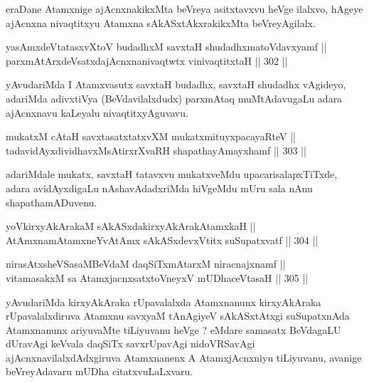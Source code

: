 \begin{artha}
eraDane Atamxnige ajAcnxnakikxMta beVreya asitxtavxvu heVge ilalxvo, hAgeye ajAcnxna nivaqtitxyu Atamxna sAkASxtAkxrakikxMta beVreyAgilalx.
\end{artha}

\begin{shl}
yasAmxdeVtatasxvXtoV budadhxM savxtaH shudadhxmatoV\s davxyamf || \\
parxmAtArxdeVsatxdajAcnxnanivaqtwtx vinivaqtitxtaH \hfill || 302 || 
\end{shl}

\begin{artha}
yAvudariMda I Atamxvasutx savxtaH budadhx, savxtaH shudadhx vAgideyo,
adariMda adivxtiVya (BeVdavilalxdudx) parxmAtaq muMtAdavugaLu adara
ajAcnxnavu kaLeyalu nivaqtitxyAguvavu.
\end{artha}

\begin{shl}
mukatxM cAtaH savxtasatxtatxvXM mukatxmituyxpacayaRteV || \\
tadavidAyxdividhavxMsAtirxrXvaRH shapathayAmayxhamf \hfill || 303 ||  
\end{shl}

\begin{artha}
adariMdale mukatx, savxtaH tatavxvu mukatxveMdu upacarisalapxTiTxde,
adara avidAyxdigaLu nAshavAdadxriMda hiVgeMdu mUru sala nAnu
shapathamADuvenu.
\end{artha}

\begin{shl}
yoV\s kirxyAkArakaM sAkASxdakirxyAkArakAtamxkaH || \\
AtAmxnamAtamxneYvA\s \s tAmx sAkASxdevxVtitx suSupatxvatf \hfill || 304 ||  
\end{shl}

\begin{shl}
nirasAtxsheVSasaMBeVdaM daqSiTxmAtarxM niracnajxnamf || \\
vitamasakxM sa AtamxjacnxsatxtoV\s neyxV mUDhaceVtasaH \hfill || 305 ||  
\end{shl}

\begin{artha}
yAvudariMda kirxyAkAraka rUpavalalxda Atamxnanunx kirxyAkAraka
rUpavalalxdiruva Atamxnu savxyaM tAnAgiyeV sAkASxtAtxgi suSupatxnAda
Atamxnanunx ariyuvaMte tiLiyuvanu heVge ? eMdare samasatx BeVdagaLU
dUravAgi keVvala daqSiTx savxrUpavAgi nidoVRSavAgi
ajAcnxnavilalxdAdxgiruva Atamxnanenx A AtamxjAcnxniyu tiLiyuvanu,
avanige beVreyAdavaru mUDha citatxvuLaLxvaru.
\end{artha}

